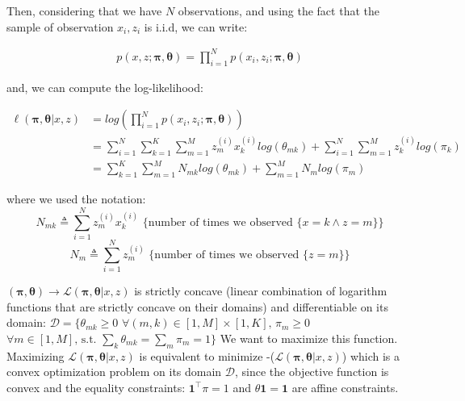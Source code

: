 \documentclass[11pt]{article}
\numberwithin{figure}{section} %
\begin{document}
Then, considering that we have $N$ observations, and using the fact that the sample of observation ${x_i, z_i}$ is i.i.d, we can write:

\begin{equation*}
\begin{aligned}
p(x, z; \boldsymbol{\pi}, \boldsymbol{\theta}) = \prod\limits_{i=1}^N p(x_i, z_i; \boldsymbol{\pi}, \boldsymbol{\theta})
\end{aligned}
\end{equation*}

and, we can compute the log-likelihood:

\begin{equation*}
\begin{split}
\ell(\boldsymbol{\pi}, \boldsymbol{\theta}|x, z) & = log \left(\prod\limits_{i=1}^N p(x_i, z_i; \boldsymbol{\pi}, \boldsymbol{\theta})\right) \\
& = \sum\limits_{i=1}^N \sum\limits_{k=1}^K \sum\limits_{m=1}^M z_{m}^{(i)} x_{k}^{(i)} log(\theta_{mk}) + \sum\limits_{i=1}^N \sum\limits_{m=1}^M z_{k}^{(i)} log(\pi_{k}) \\
& = \sum\limits_{k=1}^K \sum\limits_{m=1}^M N_{mk} log(\theta_{mk}) + \sum\limits_{m=1}^M N_{m} log(\pi_m)
\end{split}
\end{equation*}

where we used the notation:
$$N_{mk} \triangleq \sum\limits_{i=1}^N z_{m}^{(i)} x_{k}^{(i)} \text{  \{number of times we observed $\{x = k \wedge z=m\}$\}}$$
$$N_{m} \triangleq \sum\limits_{i=1}^N z_{m}^{(i)} \text{  \{number of times we observed $\{z=m\}$\}}$$

$(\boldsymbol{\pi},\boldsymbol{\theta}) \rightarrow \mathcal{L}(\boldsymbol{\pi}, \boldsymbol{\theta}|x, z)$ is strictly concave (linear combination of logarithm functions that are strictly concave on their domains) and differentiable on its domain:
\newline
$\mathcal{D} = \{ \theta_{mk} \geq 0$ $\forall (m,k) \in [1,M] \times [1, K] \text{, } \pi_{m} \geq 0$ $\forall m \in [1, M] \text{, s.t. } \sum\limits_{k} \theta_{mk} = \sum\limits_{m} \pi_m = 1\}$
\newline
 We want to maximize this function. Maximizing $\mathcal{L}(\boldsymbol{\pi}, \boldsymbol{\theta}|x, z)$ is equivalent to minimize -($\mathcal{L}(\boldsymbol{\pi}, \boldsymbol{\theta}|x, z)$) which is a convex optimization problem on its domain $\mathcal{D}$, since the objective function is convex and the equality constraints: $\boldsymbol{1}^\intercal \pi = 1$ and $ \theta \boldsymbol{1} = \boldsymbol{1}$ are affine constraints.
\end{document}
